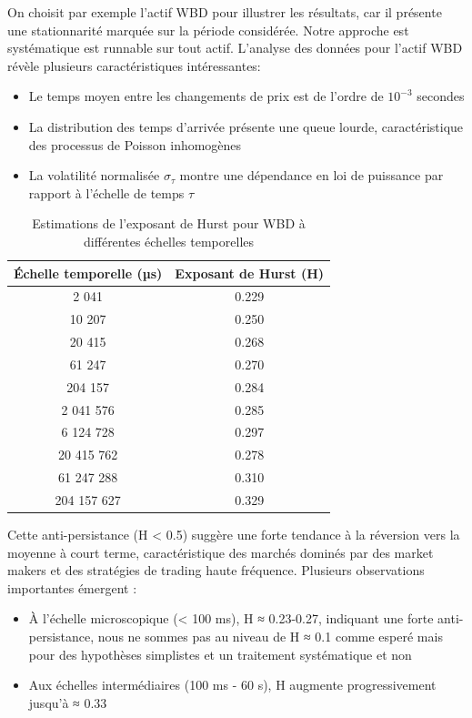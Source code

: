 \documentclass[10pt,a4paper]{article}
\theoremstyle{definition}
\theoremstyle{remark}
\begin{document}
\begin{itemize}
On choisit par exemple l'actif WBD pour illustrer les résultats, car il présente une stationnarité marquée sur la période considérée. Notre approche est systématique est runnable sur tout actif.
L'analyse des données pour l'actif WBD révèle plusieurs caractéristiques intéressantes:

\begin{itemize}
    \item Le temps moyen entre les changements de prix est de l'ordre de \(10^{-3}\) secondes
    \item La distribution des temps d'arrivée présente une queue lourde, caractéristique des processus de Poisson inhomogènes
    \item La volatilité normalisée \(\sigma_{\tau}\) montre une dépendance en loi de puissance par rapport à l'échelle de temps \(\tau\)
\end{itemize}
\begin{table}[h!]
\centering
\begin{tabular}{|c|c|}
\hline
\textbf{Échelle temporelle (µs)} & \textbf{Exposant de Hurst (H)} \\
\hline
2 041 & 0.229 \\
10 207 & 0.250 \\
20 415 & 0.268 \\
61 247 & 0.270 \\
204 157 & 0.284 \\
2 041 576 & 0.285 \\
6 124 728 & 0.297 \\
20 415 762 & 0.278 \\
61 247 288 & 0.310 \\
204 157 627 & 0.329 \\
\hline
\end{tabular}
\caption{Estimations de l'exposant de Hurst pour WBD à différentes échelles temporelles}
\label{tab:hurst_exponents}
\end{table}

Cette anti-persistance (H < 0.5) suggère une forte tendance à la réversion vers la moyenne à court terme, caractéristique des marchés dominés par des market makers et des stratégies de trading haute fréquence. Plusieurs observations importantes émergent :

\begin{itemize}
    \item À l'échelle microscopique (< 100 ms), H ≈ 0.23-0.27, indiquant une forte anti-persistance, nous ne sommes pas au niveau de H ≈ 0.1 comme esperé mais pour des hypothèses simplistes et un traitement systématique et non 
    \item Aux échelles intermédiaires (100 ms - 60 s), H augmente progressivement jusqu'à ≈ 0.33
\end{itemize}


\end{itemize}
\end{document}
